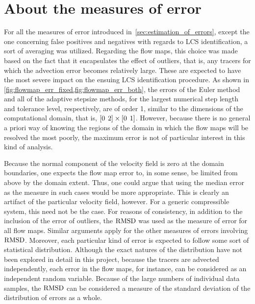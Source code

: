 \section{About the measures of error}
\label{sec:about_the_measures_of_error}

For all the measures of error introduced in~\cref{sec:estimation_of_errors},
except the one concerning false positives and negatives with regards to
LCS identification, a sort of averaging was utilized. Regarding the flow maps,
this choice was made based on the fact that it encapsulates the effect of
outliers, that is, any tracers for which the advection error becomes
relatively large. These are expected to have the most severe impact on the
ensuing LCS identification procedure. As shown in
\cref{fig:flowmap_err_fixed,fig:flowmap_err_both}, the errors of the Euler
method and all of the adaptive stepsize methods, for the largest numerical step
length and tolerance level, respectively, are of order 1, similar to the
dimensions of the computational domain, that is,
$[0\hspace{1ex}2]\times[0\hspace{1ex}1]$. However, because there is no general
a priori way of knowing the regions of the domain in which the flow maps will be
resolved the most poorly, the maximum error is not of particular interest
in this kind of analysis.

Because the normal component of the velocity field is zero at the domain
boundaries, one expects the flow map error to, in some sense, be limited from
above by the domain extent. Thus, one could argue that using the median error
as the measure in such cases would be more appropriate. This is clearly an
artifact of the particular velocity field, however. For a generic compressible
system, this need not be the case. For reasons of consistency, in addition to
the inclusion of the error of outliers, the $\operatorname{RMSD}$ was used as the measure of
error for all flow maps. Similar arguments apply for the other measures
of errors involving $\operatorname{RMSD}$. Moreover, each particular kind of error
is expected to follow some sort of statistical distribution. Although the
exact natures of the distribution have not been explored in detail in this
project, because the tracers are advected independently, each error in
the flow maps, for instance, can be considered as an independent
random variable. Because of the large numbers of individual data samples,
the $\operatorname{RMSD}$ can be considered a measure of the standard deviation of the
distribution of errors as a whole.

